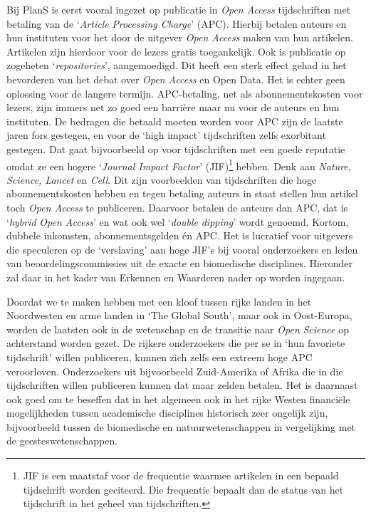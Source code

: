 \documentclass[smallauthor, chapterhaspagenum, nochapterinheader, pagenuminheader,  bigchapnum,medium2, tocpages,  garamond, titleinheader]{jote-book}
\begin{document}
	Bij PlanS is eerst vooral ingezet op publicatie in \emph{Open Access} tijdschriften met betaling van de ‘\emph{Article}\emph{ Processing Charge}' (APC). Hierbij betalen auteurs en hun instituten voor het door de uitgever \emph{Open Access} maken van hun artikelen. Artikelen zijn hierdoor voor de lezers gratis toegankelijk. Ook is publicatie op zogeheten ‘\emph{repositories}', aangemoedigd. Dit heeft een sterk effect gehad in het bevorderen van het debat over \emph{Open Access} en Open Data. Het is echter geen oplossing voor de langere termijn. APC-betaling, net als abonnementskosten voor lezers, zijn immers net zo goed een barrière maar nu voor de auteurs en hun instituten. De bedragen die betaald moeten worden voor APC zijn de laatste jaren fors gestegen, en voor de ‘high impact' tijdschriften zelfs exorbitant gestegen. Dat gaat bijvoorbeeld op voor tijdschriften met een goede reputatie omdat ze een hogere ‘\emph{Journal Impact Factor}' (JIF)\footnote{JIF is een maatstaf voor de frequentie waarmee artikelen in een bepaald tijdschrift worden geciteerd. Die frequentie bepaalt dan de status van het tijdschrift in het geheel van tijdschriften.} hebben. Denk aan \emph{Nature, }\emph{Science}\emph{, Lancet} en \emph{Cell}. Dit zijn voorbeelden van tijdschriften die hoge abonnementskosten hebben en tegen betaling auteurs in staat stellen hun artikel toch \emph{Open Access} te publiceren. Daarvoor betalen de auteurs dan APC, dat is ‘\emph{hybrid}\emph{ }\emph{Open Access}' en wat ook wel ‘\emph{double }\emph{dipping}' wordt genoemd. Kortom, dubbele inkomsten, abonnementsgelden én APC. Het is lucratief voor uitgevers die speculeren op de ‘verslaving' aan hoge JIF's bij vooral onderzoekers en leden van beoordelingscommissies uit de exacte en biomedische disciplines. Hieronder zal daar in het kader van Erkennen en Waarderen nader op worden ingegaan.



	Doordat we te maken hebben met een kloof tussen rijke landen in het Noordwesten en arme landen in ‘The Global South', maar ook in Oost-Europa, worden de laatsten ook in de wetenschap en de transitie naar \emph{Open }\emph{Science} op achterstand worden gezet. De rijkere onderzoekers die per se in ‘hun favoriete tijdschrift' willen publiceren, kunnen zich zelfs een extreem hoge APC veroorloven. Onderzoekers uit bijvoorbeeld Zuid-Amerika of Afrika die in die tijdschriften willen publiceren kunnen dat maar zelden betalen. Het is daarnaast ook goed om te beseffen dat in het algemeen ook in het rijke Westen financiële mogelijkheden tussen academische disciplines historisch zeer ongelijk zijn, bijvoorbeeld tussen de biomedische en natuurwetenschappen in vergelijking met de geesteswetenschappen.
\end{document}
